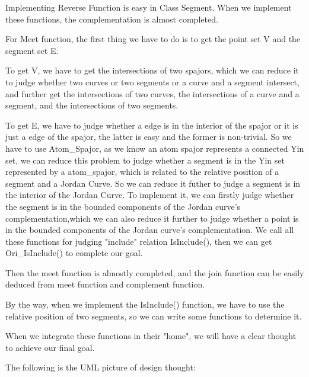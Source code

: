 \documentclass[twoside,a4paper]{article}
\begin{document}
Implementing Reverse Function is easy in Class Segment. When we
implement these functions, the complementation is 
almost completed.

\vbox{}
For Meet function, the first thing we have to do is to get the point
set V and the segment set E.

To get V, we have to get the
intersections of two spajors, which we can reduce it to judge whether
two curves or two segments or a curve and a segment intersect, and
further get the intersections of two curves, the intersections of a
curve and a segment, and the intersections of two segments.

To get E, we have to judge whether a edge is in the interior of the
spajor or it is just a edge of the spajor, the latter is easy and the
former is non-trivial. So we have to use
Atom\_Spajor, as we know an atom spajor represents a connected Yin set,
we can reduce this problem to judge whether a segment is in the Yin
set represented by a atom\_spajor, which is related to the relative
position of a segment and a Jordan Curve. So we can reduce it futher
to judge a segment is in the interior of the Jordan Curve. To
implement it, we can firstly judge whether the segment is in the
bounded components of the Jordan curve's complementation,which we can also
reduce it further to judge whether a point is in the bounded
components of the Jordan curve's complementation. We call all these
functions for judging "include" relation IsInclude(), then we can get
Ori\_IsInclude() to complete our goal.

Then the meet function is almostly completed, and the join function
can be easily deduced from meet function and complement function.

By the way, when we implement the IsInclude() function, we have to use
the relative position of two segments, so we can write some functions
to determine it.

When we integrate these functions in their "home", we will have a
clear thought to achieve our final goal.


The following is the UML picture of design thought:
\end{document}
